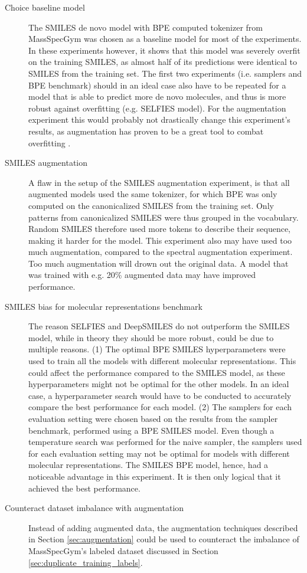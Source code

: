\begin{description}
    \item[Choice baseline model] The SMILES de novo model with \ac{BPE} computed tokenizer from MassSpecGym was chosen as a baseline model for most of the experiments. 
In these experiments however, it shows that this model was severely overfit on the training SMILES, as almost half of its predictions were identical to SMILES from the training set.
The first two experiments (i.e. samplers and \ac{BPE} benchmark) should in an ideal case also have to be repeated for a model that is able to predict more de novo molecules, and thus is more robust against overfitting (e.g. SELFIES model).
For the augmentation experiment this would probably not drastically change this experiment's results, as augmentation has proven to be a great tool to combat overfitting \cite{shorten2019survey}.
    \item[SMILES augmentation] A flaw in the setup of the SMILES augmentation experiment, is that all augmented models used the same tokenizer, for which \ac{BPE} was only computed on the canonicalized SMILES from the training set.
Only patterns from canonicalized SMILES were thus grouped in the vocabulary.
Random SMILES therefore used more tokens to describe their sequence, making it harder for the model.
This experiment also may have used too much augmentation, compared to the spectral augmentation experiment.
Too much augmentation will drown out the original data.
A model that was trained with e.g. 20\% augmented data may have improved performance.
    \item[SMILES bias for molecular representations benchmark] The reason SELFIES and DeepSMILES do not outperform the SMILES model, while in theory they should be more robust, could be due to multiple reasons.
(1) The optimal \ac{BPE} SMILES hyperparameters were used to train all the models with different molecular representations.
This could affect the performance compared to the SMILES model, as these hyperparameters might not be optimal for the other models.
In an ideal case, a hyperparameter search would have to be conducted to accurately compare the best performance for each model.
(2) The samplers for each evaluation setting were chosen based on the results from the sampler benchmark, performed using a \ac{BPE} SMILES model.
Even though a temperature search was performed for the naive sampler,
the samplers used for each evaluation setting may not be optimal for models with different molecular representations.
The SMILES \ac{BPE} model, hence, had a noticeable advantage in this experiment. It is then only logical that it achieved the best performance.
    \item[Counteract dataset imbalance with augmentation]Instead of adding augmented data, the augmentation techniques described in Section \ref{sec:augmentation} could be used to counteract the imbalance of MassSpecGym's labeled dataset discussed in Section \ref{sec:duplicate_training_labels}.


\end{description}
